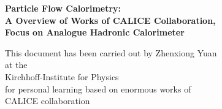 

\thispagestyle{empty}
\begin{center}
  \renewcommand{\baselinestretch}{2.00}
  \Large\bfseries\sffamily 
    Particle Flow Calorimetry:\\
    A Overview of Works of CALICE Collaboration,\\
    Focus on Analogue Hadronic Calorimeter
  \par
  \vfill
  \large\normalfont
  This document has been carried out by Zhenxiong Yuan\\
  at the\\
  Kirchhoff-Institute for Physics\\
  for personal learning based on enormous works of\\
  CALICE collaboration
\end{center}\par
\vspace{5\baselineskip}

\renewcommand{\baselinestretch}{1.00}\normalsize